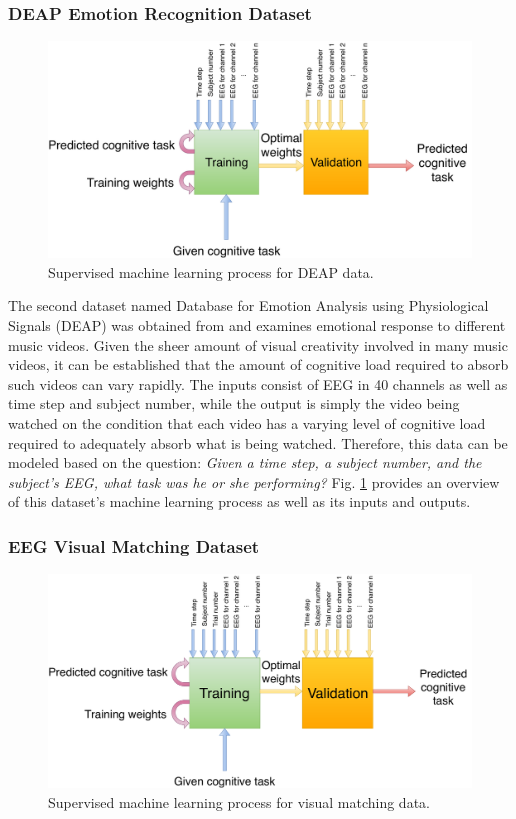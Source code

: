 \documentclass[12pt]{uthesis-v12}  %
\begin{document}
\subsubsection{DEAP Emotion Recognition Dataset}

\begin{figure}[!t]
\centering
\includegraphics[width=6in]{deap-io}
\caption{Supervised machine learning process for DEAP data.}
\label{deap-io}
\end{figure}

The second dataset named Database for Emotion Analysis using Physiological Signals (DEAP) was obtained from \cite{deap} and examines emotional response to different music videos. Given the sheer amount of visual creativity involved in many music videos, it can be established that the amount of cognitive load required to absorb such videos can vary rapidly. The inputs consist of EEG in 40 channels as well as time step and subject number, while the output is simply the video being watched on the condition that each video has a varying level of cognitive load required to adequately absorb what is being watched. Therefore, this data can be modeled based on the question: \textit{Given a time step, a subject number, and the subject’s EEG, what task was he or she performing?} Fig. \ref{deap-io} provides an overview of this dataset's machine learning process as well as its inputs and outputs.

\subsubsection{EEG Visual Matching Dataset}

\begin{figure}[!t]
\centering
\includegraphics[width=6in]{vismatch-io}
\caption{Supervised machine learning process for visual matching data.}
\label{vismatch-io}
\end{figure}
\end{document}
